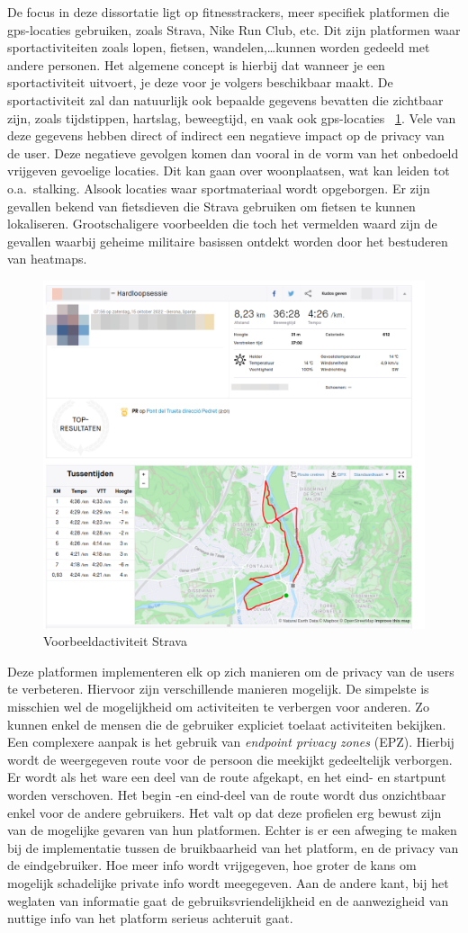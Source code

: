 De focus in deze dissortatie ligt op fitnesstrackers, meer specifiek platformen
die gps-locaties gebruiken, zoals Strava, Nike Run Club, etc. Dit zijn
platformen waar sportactiviteiten zoals lopen, fietsen, wandelen,\ldots kunnen
worden gedeeld met andere personen. Het algemene concept is hierbij dat wanneer
je een sportactiviteit uitvoert, je deze voor je volgers beschikbaar maakt. De
sportactiviteit zal dan natuurlijk ook bepaalde gegevens bevatten die zichtbaar
zijn, zoals tijdstippen, hartslag, beweegtijd, en vaak ook gps-locaties
~\ref{fig:activityExample}. Vele van deze gegevens hebben direct of indirect
een negatieve impact op de privacy van de user. Deze negatieve gevolgen komen
dan vooral in de vorm van het onbedoeld vrijgeven gevoelige locaties. Dit kan
gaan over woonplaatsen, wat kan leiden tot o.a.\ stalking. Alsook locaties waar
sportmateriaal wordt opgeborgen. Er zijn gevallen bekend van fietsdieven die
Strava gebruiken om fietsen te kunnen
lokaliseren\cite{Sportapp72:online}\cite{Cyclistw89:online}. Grootschaligere
voorbeelden die toch het vermelden waard zijn de gevallen waarbij geheime
militaire basissen ontdekt worden door het bestuderen van heatmaps. \newline
\begin{figure}
    \centering
    \includegraphics[width=0.5\linewidth]{fig/VoorbeeldActiviteit_Cropped.png}
    \caption{Voorbeeldactiviteit Strava}\label{fig:activityExample}
\end{figure}

Deze platformen implementeren elk op zich manieren om de privacy van de users
te verbeteren. Hiervoor zijn verschillende manieren mogelijk. De simpelste is
misschien wel de mogelijkheid om activiteiten te verbergen voor anderen. Zo
kunnen enkel de mensen die de gebruiker expliciet toelaat activiteiten
bekijken. Een complexere aanpak is het gebruik van \textit{endpoint privacy
    zones} (EPZ). Hierbij wordt de weergegeven route voor de persoon die meekijkt
gedeeltelijk verborgen. Er wordt als het ware een deel van de route afgekapt,
en het eind- en startpunt worden verschoven. Het begin -en eind-deel van de
route wordt dus onzichtbaar enkel voor de andere gebruikers. Het valt op dat
deze profielen erg bewust zijn van de mogelijke gevaren van hun platformen.
Echter is er een afweging te maken bij de implementatie tussen de bruikbaarheid
van het platform, en de privacy van de eindgebruiker. Hoe meer info wordt
vrijgegeven, hoe groter de kans om mogelijk schadelijke private info wordt
meegegeven. Aan de andere kant, bij het weglaten van informatie gaat de
gebruiksvriendelijkheid en de aanwezigheid van nuttige info van het platform
serieus achteruit gaat.

